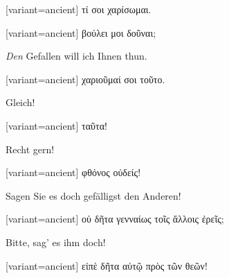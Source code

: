 %
%

\switchcolumn

\begin{greek}[variant=ancient]%
τί σοι χαρίσωμαι.

\end{greek}%
\switchcolumn*

%
%

\switchcolumn

\begin{greek}[variant=ancient]%
βούλει μοι δοῦναι;

\end{greek}%
\switchcolumn*

\emph{Den} Gefallen will ich Ihnen thun.

\switchcolumn

\begin{greek}[variant=ancient]%
χαριοῦμαί σοι τοῦτο.

\end{greek}%
\switchcolumn*

Gleich!

\switchcolumn

\begin{greek}[variant=ancient]%
ταῦτα!

\end{greek}%
\switchcolumn*

Recht gern!

\switchcolumn

\begin{greek}[variant=ancient]%
φθόνος οὐδείς!

\end{greek}%
\switchcolumn*

Sagen Sie es doch gefälligst den Anderen!

\switchcolumn

\begin{greek}[variant=ancient]%
οὐ δῆτα γενναίως τοῖς ἄλλοις ἐρεῖς;

\end{greek}%
\switchcolumn*

Bitte, sag' es ihm doch!

\switchcolumn

\begin{greek}[variant=ancient]%
εἰπὲ δῆτα αὐτῷ πρὸς τῶν θεῶν!

\end{greek}%
\switchcolumn*

